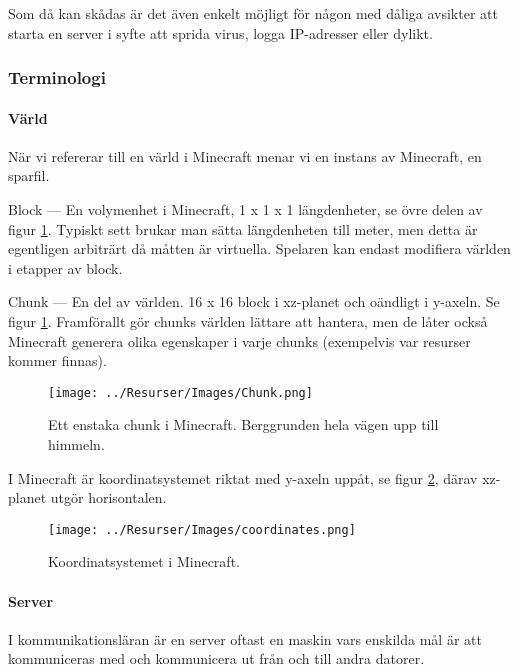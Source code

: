 \documentclass[journal,comsoc]{IEEEtran}
\begin{document}
Som då kan skådas är det även enkelt möjligt för någon med dåliga avsikter att starta en server i syfte att sprida virus, logga IP-adresser eller dylikt.
\subsubsection{Terminologi}
\paragraph{Värld}
När vi refererar till en värld i Minecraft menar vi en instans av Minecraft, en sparfil. 



Block ---
En volymenhet i Minecraft, 1 x 1 x 1 längdenheter, se övre delen av figur \ref{fig:minecraftchunk}. Typiskt sett brukar man sätta längdenheten till meter, men detta är egentligen arbiträrt då måtten är virtuella. Spelaren kan endast modifiera världen i etapper av block.

Chunk ---
En del av världen. 16 x 16 block i xz-planet och oändligt i y-axeln. Se figur \ref{fig:minecraftchunk}. Framförallt gör chunks världen lättare att hantera, men de låter också Minecraft generera olika egenskaper i varje chunks (exempelvis var resurser kommer finnas).

\begin{figure} [H]
  \centering
  \texttt{[image: ../Resurser/Images/Chunk.png]}
  \caption{Ett enstaka chunk i Minecraft. Berggrunden hela vägen upp till himmeln. \cite{fanmcwiki:chunk}}
  \label{fig:minecraftchunk}
\end{figure}

I Minecraft är koordinatsystemet riktat med y-axeln uppåt, se figur \ref{fig:minecraftcoords}, därav xz-planet utgör horisontalen. 

\begin{figure} [H]
  \centering
  \texttt{[image: ../Resurser/Images/coordinates.png]}
  \caption{Koordinatsystemet i Minecraft. \cite{coderdojo:mccoords}}
  \label{fig:minecraftcoords}
\end{figure}
 
\paragraph{Server}
I kommunikationsläran är en server oftast en maskin vars enskilda mål är att kommuniceras med och kommunicera ut från och till andra datorer. \cite{wikipedia:server}
\end{document}
